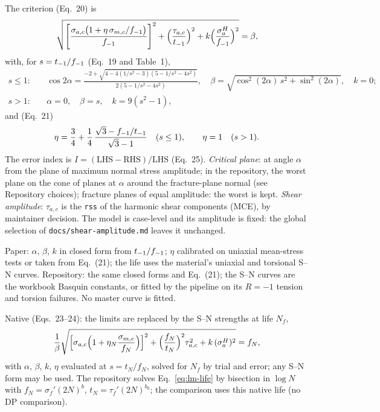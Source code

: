  The criterion (Eq.~20) is
\begin{equation}
\sqrt{\left[\frac{\sigma_{a,c}\bigl(1+\eta\,\sigma_{m,c}/f_{-1}\bigr)}{f_{-1}}\right]^2
+\Bigl(\frac{\tau_{a,c}}{t_{-1}}\Bigr)^2 + k\Bigl(\frac{\sigma^H_a}{f_{-1}}\Bigr)^2} = \beta ,
\label{eq:lm}
\end{equation}
with, for $s=t_{-1}/f_{-1}$ (Eq.~19 and Table~1),
\begin{equation}
\begin{aligned}
s\le1:&\quad \cos2\alpha=\frac{-2+\sqrt{4-4(1/s^2-3)(5-1/s^2-4s^2)}}{2(5-1/s^2-4s^2)},\quad
\beta=\sqrt{\cos^2(2\alpha)\,s^2+\sin^2(2\alpha)},\quad k=0;\\
s>1:&\quad \alpha=0,\quad \beta=s,\quad k=9(s^2-1),
\end{aligned}
\label{eq:lm-alpha}
\end{equation}
and (Eq.~21)
\begin{equation}
\eta = \frac34 + \frac14\,\frac{\sqrt3-f_{-1}/t_{-1}}{\sqrt3-1}\quad(s\le1),\qquad \eta=1\quad(s>1).
\label{eq:lm-eta}
\end{equation}
The error index is $I=(\mathrm{LHS}-\mathrm{RHS})/\mathrm{LHS}$ (Eq.~25). \emph{Critical plane}: at
angle $\alpha$ from the plane of maximum normal stress amplitude; in the repository, the worst plane
on the cone of planes at $\alpha$ around the fracture-plane normal (see Repository choices); fracture
planes of equal amplitude: the worst is kept. \emph{Shear amplitude}: $\tau_{a,c}$ is the \texttt{rss}
of the harmonic shear components (MCE), by maintainer decision. The model is case-level and its
amplitude is fixed: the global selection of \texttt{docs/shear-amplitude.md} leaves it unchanged.

 Paper: $\alpha$, $\beta$, $k$ in closed form from $t_{-1}/f_{-1}$; $\eta$
calibrated on uniaxial mean-stress tests or taken from Eq.~(21); the life uses the material's uniaxial
and torsional S--N curves. Repository: the same closed forms and Eq.~(21); the S--N curves are the
workbook Basquin constants, or fitted by the pipeline on its $R=-1$ tension and torsion failures. No
master curve is fitted.

 Native (Eqs.~23--24): the limits are replaced by the S--N strengths at life $N_f$,
\begin{equation}
\frac1\beta\sqrt{\Bigl[\sigma_{a,c}\Bigl(1+\eta_N\frac{\sigma_{m,c}}{f_N}\Bigr)\Bigr]^2
+\Bigl(\frac{f_N}{t_N}\Bigr)^2\tau_{a,c}^2 + k\,(\sigma^H_a)^2} = f_N ,
\label{eq:lm-life}
\end{equation}
with $\alpha$, $\beta$, $k$, $\eta$ evaluated at $s=t_N/f_N$, solved for $N_f$ by trial and error;
any S--N form may be used. The repository solves Eq.~\eqref{eq:lm-life} by bisection in $\log N$ with
$f_N=\sigma_f'(2N)^b$, $t_N=\tau_f'(2N)^{b_0}$; the comparison uses this native life (no DP
comparison).

